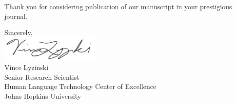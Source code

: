 \documentclass{letter}
\begin{document}
\begin{letter}
Thank you for considering publication of our manuscript in your prestigious journal.

Sincerely,\\
\includegraphics[width=5cm]{signature}\\
Vince Lyzinski\\
Senior Research Scientist\\
Human Language Technology Center of Excellence\\
Johns Hopkins University

\end{letter}
\end{document}
